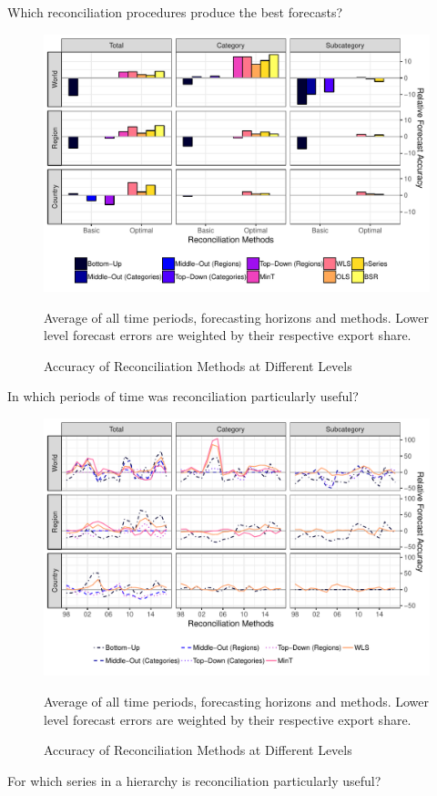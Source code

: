 \documentclass[a4paper,fleqn,11pt]{article}
\begin{document}
Which reconciliation procedures produce the best forecasts?
 \begin{figure}[H]
	\includegraphics[width=\textwidth]{fig/fig_eval_rmse_relative}
	\caption{Accuracy of Reconciliation Methods at Different Levels}
	\footnotesize{Average of all time periods, forecasting horizons and methods. Lower level forecast errors are weighted by their respective export share.}
\end{figure}
In which periods of time was reconciliation particularly useful?
 \begin{figure}[H]
	\includegraphics[width=\textwidth]{fig/fig_eval_rmse_time}
	\caption{Accuracy of Reconciliation Methods at Different Levels}
	\footnotesize{Average of all time periods, forecasting horizons and methods. Lower level forecast errors are weighted by their respective export share.}
\end{figure}
For which series in a hierarchy is reconciliation particularly useful?
\end{document}
